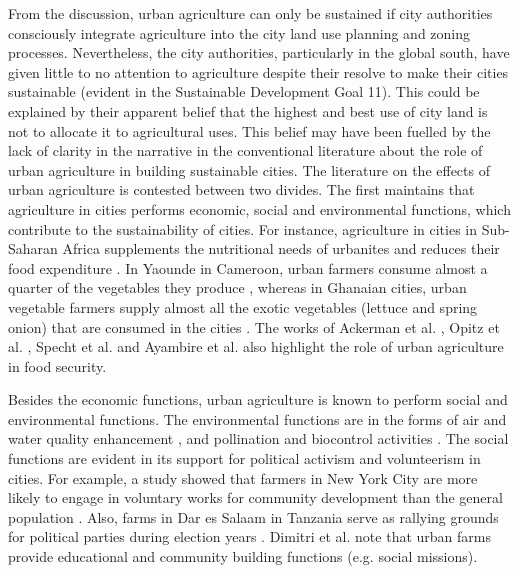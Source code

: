 From the discussion, urban agriculture can only be sustained if city authorities consciously integrate agriculture into the city land use planning and zoning processes. Nevertheless, the city authorities, particularly in the global south, have given little to no attention to agriculture despite their resolve to make their cities sustainable (evident in the Sustainable Development Goal 11). This could be explained by their apparent belief that the highest and best use of city land is not to allocate it to agricultural uses. This belief may have been fuelled by the lack of clarity in the narrative in the conventional literature about the role of urban agriculture in building sustainable cities. The literature on the effects of urban agriculture is contested between two divides. The first maintains that agriculture in cities performs economic, social and environmental functions, which contribute to the sustainability of cities. For instance, agriculture in cities in Sub-Saharan Africa supplements the nutritional needs of urbanites and reduces their food expenditure \cite{Binns2013}. In Yaounde in Cameroon, urban farmers consume almost a quarter of the vegetables they produce \cite{Prain2010}, whereas in Ghanaian cities, urban vegetable farmers supply almost all the exotic vegetables (lettuce and spring onion) that are consumed in the cities \cite{Kodjo2014, Drechsel2014}. The works of Ackerman et al. \cite{Ackerman2014}, Opitz et al. \cite{Opitz2016}, Specht et al. \cite{Specht2014} and Ayambire et al. \cite{Ayambire2019} also highlight the role of urban agriculture in food security.

Besides the economic functions, urban agriculture is known to perform social and environmental functions. The environmental functions are in the forms of air and water quality enhancement \cite{Lin2015} , and pollination and biocontrol activities \cite{Lin2015, Camps-Calvet2016}. The social functions are evident in its support for political activism and volunteerism in cities. For example, a study showed that farmers in New York City are more likely to engage in voluntary works for community development than the general population \cite{Obach2014, Pole2013}. Also, farms in Dar es Salaam in Tanzania serve as rallying grounds for political parties during election years \cite{McLees}. Dimitri et al. \cite{Dimitri2016} note that urban farms provide educational and community building functions (e.g. social missions).


